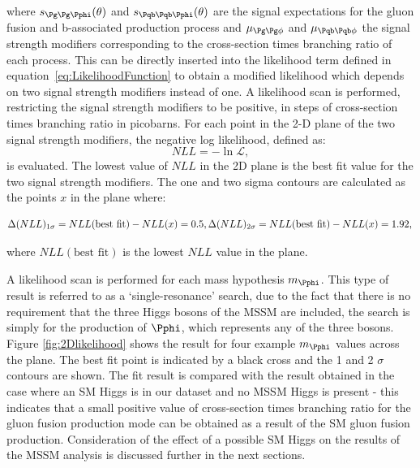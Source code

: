 where $s_{\Pg\Pg\Pphi}(\theta)$ and $s_{\Pqb\Pqb\Pphi}(\theta)$ are the signal expectations for the gluon
fusion and b-associated production process and $\mu_{\Pg\Pg\phi}$ and
$\mu_{\Pqb\Pqb\phi}$
the signal strength modifiers corresponding to the cross-section times branching
ratio of each process. This can be directly inserted into the likelihood
term defined in equation~\ref{eq:LikelihoodFunction} to obtain a modified
likelihood which depends on two signal strength modifiers instead of one. A
likelihood scan is performed, restricting the signal strength modifiers to
be positive, in steps of cross-section times branching ratio in picobarns. For
each point in the 2-D plane of the two signal strength modifiers, the negative
log likelihood, defined as:
\begin{equation}
NLL = - \ln \mathcal{L} ,  
\end{equation}
is evaluated. The lowest value of $NLL$ in the 2D plane is the best fit value
for the two signal strength modifiers. The one and two sigma contours are
calculated as the points $x$ in the plane where:

\begin{equation}
\Delta(NLL)_{1\sigma} = NLL(\text{best fit}) - NLL(x) = 0.5 ,\\ 
\Delta(NLL)_{2\sigma} = NLL(\text{best fit}) - NLL(x) = 1.92 ,\\ 
\end{equation}

where $NLL(\text{best fit})$ is the lowest $NLL$ value in the plane.

A likelihood scan is performed for each mass hypothesis $m_{\Pphi}$. 
This type of result is referred to as a `single-resonance' search,
due to the fact that there is no requirement that the three Higgs bosons of the
\ac{MSSM} are included, the search is simply for the production of $\Pphi$,
which represents any of the three bosons. Figure \ref{fig:2Dlikelihood} shows the 
result for four example $m_{\Pphi}$ values across the
plane. The best fit point is indicated by a black cross and the 1 and 2 $\sigma$
contours are shown. The fit result is compared with the result obtained in the
case where an \ac{SM} Higgs is in our dataset and no \ac{MSSM} Higgs is present
- this indicates that a small positive value of cross-section times branching
ratio for the gluon fusion production mode can be obtained as a result of the
\ac{SM} gluon fusion production. Consideration of the effect of a possible
\ac{SM} Higgs on the results of the \ac{MSSM} analysis is discussed further in
the next sections.


